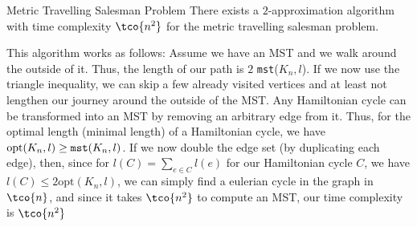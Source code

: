 \begin{theorem}[]{Metric Travelling Salesman Problem}
    There exists a $2$-approximation algorithm with time complexity $\tco{n^2}$ for the metric travelling salesman problem.
\end{theorem}

\shortproof This algorithm works as follows: Assume we have an MST and we walk around the outside of it. 
Thus, the length of our path is $2$ \verb|mst|($K_n, l$). 
If we now use the triangle inequality, we can skip a few already visited vertices and at least not lengthen our journey around the outside of the MST.
Any Hamiltonian cycle can be transformed into an MST by removing an arbitrary edge from it.
Thus, for the optimal length (minimal length) of a Hamiltonian cycle, we have $\text{opt}(K_n, l) \geq \verb|mst|(K_n, l)$. 
If we now double the edge set (by duplicating each edge), then, since for $l(C) = \sum_{e \in C} l(e)$ for our Hamiltonian cycle $C$, we have $l(C) \leq 2 \text{opt}(K_n, l)$, we can simply find a eulerian cycle in the graph in $\tco{n}$, and since it takes $\tco{n^2}$ to compute an MST, our time complexity is $\tco{n^2}$


